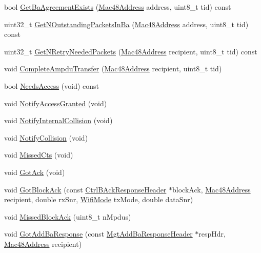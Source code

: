 \begin{DoxyCompactItemize}
\item 
bool \hyperlink{classns3_1_1EdcaTxopN_abf17485d78cd742b9319cb31f658cbd2}{Get\+Ba\+Agreement\+Exists} (\hyperlink{classns3_1_1Mac48Address}{Mac48\+Address} address, uint8\+\_\+t tid) const 
\item 
uint32\+\_\+t \hyperlink{classns3_1_1EdcaTxopN_ac6c32c54e56d0422e23526b30c9287ff}{Get\+N\+Outstanding\+Packets\+In\+Ba} (\hyperlink{classns3_1_1Mac48Address}{Mac48\+Address} address, uint8\+\_\+t tid) const 
\item 
uint32\+\_\+t \hyperlink{classns3_1_1EdcaTxopN_a76552b251742d17a29440dbef5c07f64}{Get\+N\+Retry\+Needed\+Packets} (\hyperlink{classns3_1_1Mac48Address}{Mac48\+Address} recipient, uint8\+\_\+t tid) const 
\item 
void \hyperlink{classns3_1_1EdcaTxopN_a98274aa9d1577b6f74b8a47149326eff}{Complete\+Ampdu\+Transfer} (\hyperlink{classns3_1_1Mac48Address}{Mac48\+Address} recipient, uint8\+\_\+t tid)
\item 
bool \hyperlink{classns3_1_1EdcaTxopN_a251053902891cd35ff8c98cf145078f9}{Needs\+Access} (void) const 
\item 
void \hyperlink{classns3_1_1EdcaTxopN_afeba080a6bf7d6074227e10321d1683d}{Notify\+Access\+Granted} (void)
\item 
void \hyperlink{classns3_1_1EdcaTxopN_a900ab43f62b74939c62121562d1969e2}{Notify\+Internal\+Collision} (void)
\item 
void \hyperlink{classns3_1_1EdcaTxopN_aa9dd10b3b7236f93d7461b174888e2a8}{Notify\+Collision} (void)
\item 
void \hyperlink{classns3_1_1EdcaTxopN_ab6f7016d503472174ce9fef2fd45de8e}{Missed\+Cts} (void)
\item 
void \hyperlink{classns3_1_1EdcaTxopN_acd117ddd03aa1b3abac3bca9830ee895}{Got\+Ack} (void)
\item 
void \hyperlink{classns3_1_1EdcaTxopN_a36c24d5a9717893466eaadda6bd66cc5}{Got\+Block\+Ack} (const \hyperlink{classns3_1_1CtrlBAckResponseHeader}{Ctrl\+B\+Ack\+Response\+Header} $\ast$block\+Ack, \hyperlink{classns3_1_1Mac48Address}{Mac48\+Address} recipient, double rx\+Snr, \hyperlink{classns3_1_1WifiMode}{Wifi\+Mode} tx\+Mode, double data\+Snr)
\item 
void \hyperlink{classns3_1_1EdcaTxopN_a91aae2c1ab764e8e4cb857ef97fa235b}{Missed\+Block\+Ack} (uint8\+\_\+t n\+Mpdus)
\item 
void \hyperlink{classns3_1_1EdcaTxopN_ac3089ca4272d45b23293a7481e0922e0}{Got\+Add\+Ba\+Response} (const \hyperlink{classns3_1_1MgtAddBaResponseHeader}{Mgt\+Add\+Ba\+Response\+Header} $\ast$resp\+Hdr, \hyperlink{classns3_1_1Mac48Address}{Mac48\+Address} recipient)

\end{DoxyCompactItemize}
